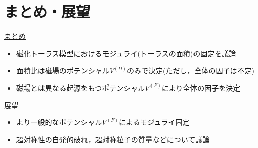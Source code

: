 \documentclass[
  unicode,a4paper,11pt,aspectratio=169,
  xcolor = {dvipsnames,svgnames},
  hyperref ={colorlinks=true,citecolor=Navy,linkcolor=NavyBlue,urlcolor=purple},
  ja=standard,lualatex
]{beamer}
\renewcommand{\theequation}{\thesection.\arabic{equation}}
\renewcommand{\thefigure}{\thesection.\arabic{figure}}
\renewcommand{\thetable}{\thesection.\arabic{table}}
\begin{document}
\section{まとめ・展望}

\begin{frame}

  \uline{まとめ}
  \begin{itemize}
    \item 
    磁化トーラス模型におけるモジュライ(トーラスの面積)の固定を議論
    \item 
    面積比は磁場のポテンシャル$V^{(D)}$のみで決定(ただし，全体の因子は不定)
    \item 
    磁場とは異なる起源をもつポテンシャル$V^{(F)}$により全体の因子を決定
  \end{itemize}

  \uline{展望}
  \begin{itemize}
    \item 
    より一般的なポテンシャル$V^{(F)}$によるモジュライ固定
    \item 
    超対称性の自発的破れ，超対称粒子の質量などについて議論
  \end{itemize}
  
\end{frame}



   
   



\end{document}
